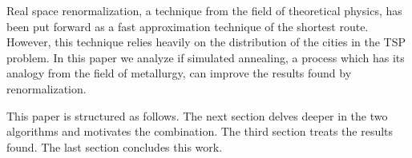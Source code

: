 Real space renormalization, a technique from the field of theoretical physics,
has been put forward as a fast approximation technique of the shortest route.
However, this technique relies heavily on the distribution of the cities in
the TSP problem. In this paper we analyze if simulated annealing, a process
which has its analogy from the field of metallurgy, can improve the results
found by renormalization.

This paper is structured as follows. The next section delves deeper in the two
algorithms and motivates the combination. The third section treats the results
found. The last section concludes this work.
\IEEEpubidadjcol %


